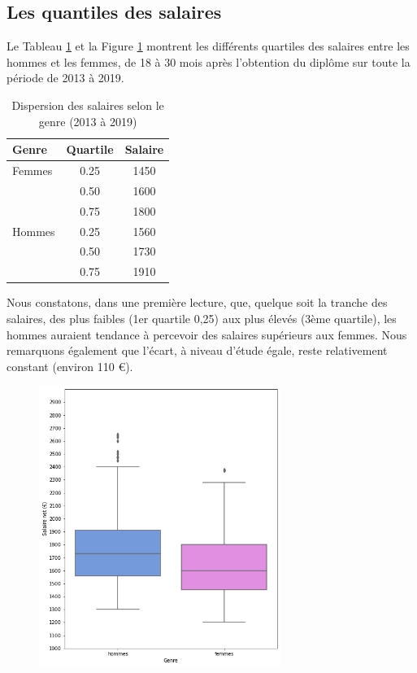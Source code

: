 \documentclass[12pt, a4paper, titlepage, table]{article}
\begin{document}
	\subsection{Les quantiles des salaires}	
	Le Tableau \ref{tab:quartile_salaire_genre} et la Figure \ref{fig:boxplot_salaire_genre} montrent les différents quartiles des salaires entre les hommes et les femmes, de 18 à 30 mois après l'obtention du diplôme sur toute la période de 2013 à 2019.
	
	\begin{table}[H]
		\centering
		\begin{tabular}{lcc}
			\toprule
			\textbf{Genre} & \textbf{Quartile} & \textbf{Salaire} \\
			\midrule
			Femmes & 0.25 & 1450 \\
			& 0.50 & 1600 \\
			& 0.75 & 1800 \\
			\midrule
			Hommes & 0.25 & 1560 \\
			& 0.50 & 1730 \\
			& 0.75 & 1910 \\
			\bottomrule
		\end{tabular}
		\caption{Dispersion des salaires selon le genre (2013 à 2019)}
		\label{tab:quartile_salaire_genre}
	\end{table}
	
	
	Nous constatons, dans une première lecture, que, quelque soit la tranche des salaires, des plus faibles (1er quartile 0,25) aux plus élevés (3ème quartile), les hommes auraient tendance à percevoir des salaires supérieurs aux femmes. Nous remarquons également que l'écart, à niveau d'étude égale, reste relativement constant (environ 110 €).
		
	
	\begin{figure}[H]
		\centering
		\includegraphics[width=0.7\textwidth]{../graphs/boxplot_salaire_genre.png}
		\label{fig:boxplot_salaire_genre}
	\end{figure}
	
\end{document}
